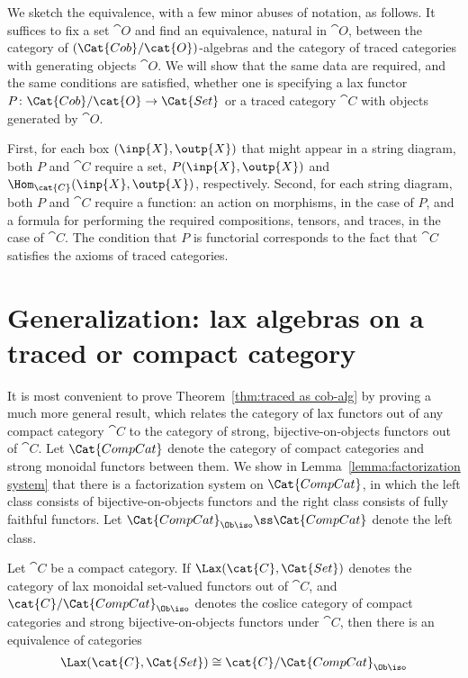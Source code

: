 We sketch the equivalence, with a few minor abuses of notation, as follows. It suffices to fix a set $\cat{O}$ and find an equivalence, natural in $\cat{O}$, between the category of $(\Cat{Cob}/\cat{O})$-algebras and the category of traced categories with  generating objects $\cat{O}$. We will show that the same data are required, and the same conditions are satisfied, whether one is specifying a lax functor $P\colon\Cat{Cob}/\cat{O}\to\Cat{Set}$ or a traced category $\cat{C}$ with objects generated by $\cat{O}$. 

First, for each box $(\inp{X},\outp{X})$ that might appear in a string diagram, both $P$ and $\cat{C}$ require a set, $P(\inp{X},\outp{X})$ and $\Hom_{\cat{C}}(\inp{X},\outp{X})$, respectively. Second, for each string diagram, both $P$ and $\cat{C}$ require a function: an action on morphisms, in the case of $P$, and a formula for performing the required compositions, tensors, and traces, in the case of $\cat{C}$. The condition that $P$ is functorial corresponds to the fact that $\cat{C}$ satisfies the axioms of traced categories.

\section{Generalization: lax algebras on a traced or compact category}

It is most convenient to prove Theorem~\ref{thm:traced as cob-alg} by proving a much more general result, which relates the category of lax functors out of any compact category $\cat{C}$ to the category of strong, bijective-on-objects functors out of $\cat{C}$. Let $\Cat{CompCat}$ denote the category of compact categories and strong monoidal functors between them. We show in Lemma~\ref{lemma:factorization system} that there is a factorization system on $\Cat{CompCat}$, in which the left class consists of bijective-on-objects functors and the right class consists of fully faithful functors. Let $\Cat{CompCat}_{\Ob\iso}\ss\Cat{CompCat}$ denote the left class. 

\begin{theorem}\label{thm:compact lax and strong}
 Let $\cat{C}$ be a compact category. If $\Lax(\cat{C},\Cat{Set})$ denotes the category of lax monoidal set-valued functors out of $\cat{C}$, and $\cat{C}/\Cat{CompCat}_{\Ob\iso}$ denotes the coslice category of compact categories and strong bijective-on-objects functors under $\cat{C}$, then there is an equivalence of categories
\begin{align}\label{dia:compact lax strong}
\Lax(\cat{C},\Cat{Set})\cong\cat{C}/\Cat{CompCat}_{\Ob\iso}
\end{align}
\end{theorem}


